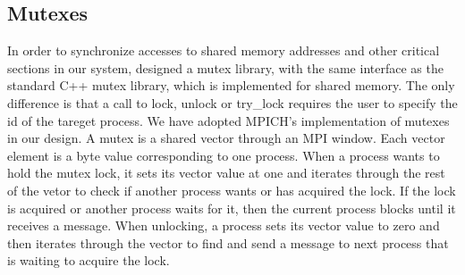 \subsection{Mutexes}
In order to synchronize accesses to shared memory addresses and other critical sections in our system, designed
a mutex library, with the same interface as the standard C++ mutex library, which is implemented
for shared memory.  The only difference is that a call to lock, unlock or try\_lock requires the user to specify
the id of the tareget process. We have adopted MPICH's implementation of mutexes in our design.  A mutex is a
shared vector through an MPI window.  Each vector element is a byte value corresponding to one process.  When
a process wants to hold the mutex lock, it sets its vector value at one and iterates through the rest of the 
vetor to check if another process wants or has acquired the lock.  If the lock is acquired or another process 
waits for it, then the current process blocks until it receives a message.  When unlocking, a process sets its 
vector value to zero and then iterates through the vector to find and send a message to next process that is 
waiting to acquire the lock.  

